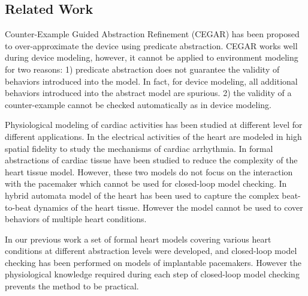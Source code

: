 \subsection{Related Work}
Counter-Example Guided Abstraction Refinement (CEGAR) \cite{CEGAR} has been proposed to over-approximate the device using predicate abstraction. 
CEGAR works well during device modeling, however, it cannot be applied to environment modeling for two reasons: 1) predicate abstraction does not guarantee the validity of behaviors introduced into the model. In fact, for device modeling, all additional behaviors introduced into the abstract model are spurious. 2) the validity of a counter-example cannot be checked automatically as in device modeling. 

Physiological modeling of cardiac activities has been studied at different level for different applications. In \cite{natalia} the electrical activities of the heart are modeled in high spatial fidelity to study the mechanisms of cardiac arrhythmia. In \cite{radu} formal abstractions of cardiac tissue have been studied to reduce the complexity of the heart tissue model. However, these two models do not focus on the interaction with the pacemaker which cannot be used for closed-loop model checking. In \cite{marta} hybrid automata model of the heart has been used to capture the complex beat-to-beat dynamics of the heart tissue. However the model cannot be used to cover behaviors of multiple heart conditions.

In our previous work \cite{sttt13} a set of formal heart models covering various heart conditions at different abstraction levels were developed, and closed-loop model checking has been performed on models of implantable pacemakers. 
However the physiological knowledge required during each step of closed-loop model checking prevents the method to be practical.

